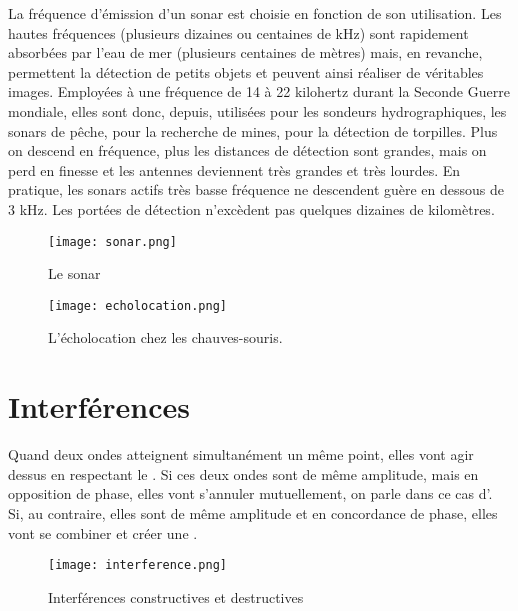 \begin{tcolorbox}[title=Sonar]
    La fréquence d'émission d'un sonar est choisie en fonction de son utilisation. Les hautes fréquences (plusieurs dizaines ou centaines de kHz) sont rapidement absorbées par l'eau de mer (plusieurs centaines de mètres) mais, en revanche, permettent la détection de petits objets et peuvent ainsi réaliser de véritables images. Employées à une fréquence de 14 à 22 kilohertz durant la Seconde Guerre mondiale, elles sont donc, depuis, utilisées pour les sondeurs hydrographiques, les sonars de pêche, pour la recherche de mines, pour la détection de torpilles.
    Plus on descend en fréquence, plus les distances de détection sont grandes, mais on perd en finesse et les antennes deviennent très grandes et très lourdes. En pratique, les sonars actifs très basse fréquence ne descendent guère en dessous de 3 kHz. Les portées de détection n'excèdent pas quelques dizaines de kilomètres.
\end{tcolorbox}

\begin{figure}[h]
    \begin{minipage}{.5\textwidth}
        \centering
        \texttt{[image: sonar.png]}
        \caption{Le sonar}
    \end{minipage}
    \begin{minipage}{.5\textwidth}
        \centering
        \texttt{[image: echolocation.png]}
        \caption{L'écholocation chez les chauves-souris.}
    \end{minipage}
\end{figure}

\newpage

\section{Interférences}
Quand deux ondes atteignent simultanément un même point, elles vont agir dessus en respectant le . Si ces deux ondes sont de même amplitude, mais en opposition de phase, elles vont s'annuler mutuellement, on parle dans ce cas d'.
Si, au contraire, elles sont de même amplitude et en concordance de phase, elles vont se combiner et créer une .

\begin{figure}[h]
    \centering
    \texttt{[image: interference.png]}
    \caption{Interférences constructives et destructives}
\end{figure}

